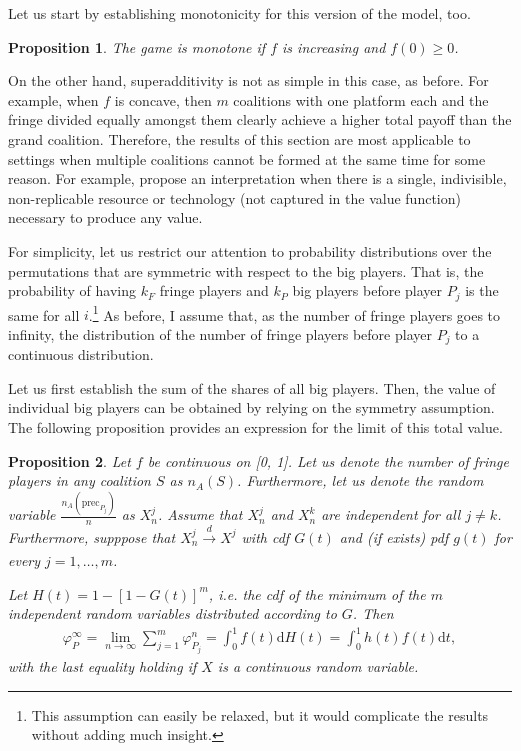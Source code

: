 \documentclass[a4paper]{article}
\newtheorem{proposition}{Proposition}
\newcommand{\dt}{\mathrm{d}t}
\newcommand{\dH}{\mathrm{d}H}
\newcommand{\precede}{\mathrm{prec}}
\begin{document}
Let us start by establishing monotonicity for this version of the model, too.
\begin{proposition}
    The game is monotone if $f$ is increasing and $f(0) \geq 0$.
\end{proposition}
On the other hand, superadditivity is not as simple in this case, as before.
For example, when $f$ is concave, then $m$ coalitions with one platform each and the fringe divided equally amongst them clearly achieve a higher total payoff than the grand coalition.
Therefore, the results of this section are most applicable to settings when multiple coalitions cannot be formed at the same time for some reason.
For example, \textcite{hart1996bargaining} propose an interpretation when there is a single, indivisible, non-replicable resource or technology (not captured in the value function) necessary to produce any value.

For simplicity, let us restrict our attention to probability distributions over the permutations that are symmetric with respect to the big players.
That is, the probability of having $k_F$ fringe players and $k_P$ big players before player $P_j$ is the same for all $i$.\footnote{
    This assumption can easily be relaxed, but it would complicate the results without adding much insight.
}
As before, I assume that, as the number of fringe players goes to infinity, the distribution of the number of fringe players before player $P_j$ to a continuous distribution.

Let us first establish the sum of the shares of all big players.
Then, the value of individual big players can be obtained by relying on the symmetry assumption.
The following proposition provides an expression for the limit of this total value.
\begin{proposition}
    \label{prop:multiple_platforms_total}
    Let $f$ be continuous on [0, 1].
    Let us denote the number of fringe players in any coalition $S$ as $n_A(S)$.
    Furthermore, let us denote the random variable $\frac{n_A(\precede_{P_j})}{n}$ as $X_n^j$.
    Assume that $X_n^j$ and $X_n^k$ are independent for all $j \neq k$.
    Furthermore, supppose that $X_n^j \xrightarrow[]{d} X^j$ with cdf $G(t)$ and (if exists) pdf $g(t)$ for every $j = 1, \dots, m$.

    Let $H(t) = 1 - [1 - G(t)]^m$, i.e. the cdf of the minimum of the $m$ independent random variables distributed according to $G$.
    Then
    \begin{align*}
        \varphi_P^\infty = \lim_{n \to \infty} \sum_{j=1}^m \varphi_{P_j}^n = \int_0^1 f(t) \dH(t) = \int_0^1 h(t) f(t) \dt,
    \end{align*}
    with the last equality holding if $X$ is a continuous random variable.
\end{proposition}
\end{document}
